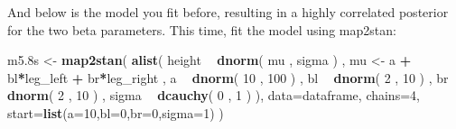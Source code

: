 \documentclass[]{article}
\newenvironment{Shaded}{\begin{snugshade}}{\end{snugshade}}
\newcommand{\KeywordTok}[1]{\textcolor[rgb]{0.13,0.29,0.53}{\textbf{#1}}}
\newcommand{\DataTypeTok}[1]{\textcolor[rgb]{0.13,0.29,0.53}{#1}}
\newcommand{\DecValTok}[1]{\textcolor[rgb]{0.00,0.00,0.81}{#1}}
\newcommand{\StringTok}[1]{\textcolor[rgb]{0.31,0.60,0.02}{#1}}
\newcommand{\OperatorTok}[1]{\textcolor[rgb]{0.81,0.36,0.00}{\textbf{#1}}}
\newcommand{\NormalTok}[1]{#1}
\begin{document}
And below is the model you fit before, resulting in a highly correlated
posterior for the two beta parameters. This time, fit the model using
map2stan:

\begin{Shaded}
\begin{Highlighting}[]
\NormalTok{m5.8s <-}\StringTok{ }\KeywordTok{map2stan}\NormalTok{(}
    \KeywordTok{alist}\NormalTok{(}
\NormalTok{        height }\OperatorTok{~}\StringTok{ }\KeywordTok{dnorm}\NormalTok{( mu , sigma ) ,}
\NormalTok{        mu <-}\StringTok{ }\NormalTok{a }\OperatorTok{+}\StringTok{ }\NormalTok{bl}\OperatorTok{*}\NormalTok{leg_left }\OperatorTok{+}\StringTok{ }\NormalTok{br}\OperatorTok{*}\NormalTok{leg_right ,}
\NormalTok{        a }\OperatorTok{~}\StringTok{ }\KeywordTok{dnorm}\NormalTok{( }\DecValTok{10}\NormalTok{ , }\DecValTok{100}\NormalTok{ ) ,}
\NormalTok{        bl }\OperatorTok{~}\StringTok{ }\KeywordTok{dnorm}\NormalTok{( }\DecValTok{2}\NormalTok{ , }\DecValTok{10}\NormalTok{ ) ,}
\NormalTok{        br }\OperatorTok{~}\StringTok{ }\KeywordTok{dnorm}\NormalTok{( }\DecValTok{2}\NormalTok{ , }\DecValTok{10}\NormalTok{ ) ,}
\NormalTok{        sigma }\OperatorTok{~}\StringTok{ }\KeywordTok{dcauchy}\NormalTok{( }\DecValTok{0}\NormalTok{ , }\DecValTok{1}\NormalTok{ )}
\NormalTok{),}
\DataTypeTok{data=}\NormalTok{dataframe, }\DataTypeTok{chains=}\DecValTok{4}\NormalTok{, }\DataTypeTok{start=}\KeywordTok{list}\NormalTok{(}\DataTypeTok{a=}\DecValTok{10}\NormalTok{,}\DataTypeTok{bl=}\DecValTok{0}\NormalTok{,}\DataTypeTok{br=}\DecValTok{0}\NormalTok{,}\DataTypeTok{sigma=}\DecValTok{1}\NormalTok{) )}
\end{Highlighting}
\end{Shaded}
\end{document}
